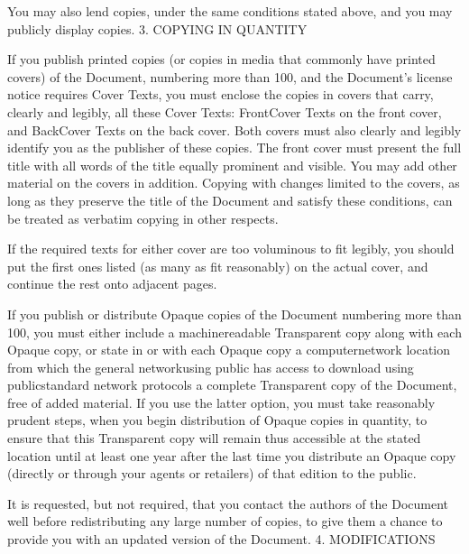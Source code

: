 \documentclass[letterpaper,10pt,english]{sphinxmanual}
\begin{document}
\sphinxAtStartPar
You may also lend copies, under the same conditions stated above, and you may publicly display copies.
3. COPYING IN QUANTITY

\sphinxAtStartPar
If you publish printed copies (or copies in media that commonly have printed covers) of the Document, numbering more than 100, and the Document’s license notice requires Cover Texts, you must enclose the copies in covers that carry, clearly and legibly, all these Cover Texts: Front\sphinxhyphen{}Cover Texts on the front cover, and Back\sphinxhyphen{}Cover Texts on the back cover. Both covers must also clearly and legibly identify you as the publisher of these copies. The front cover must present the full title with all words of the title equally prominent and visible. You may add other material on the covers in addition. Copying with changes limited to the covers, as long as they preserve the title of the Document and satisfy these conditions, can be treated as verbatim copying in other respects.

\sphinxAtStartPar
If the required texts for either cover are too voluminous to fit legibly, you should put the first ones listed (as many as fit reasonably) on the actual cover, and continue the rest onto adjacent pages.

\sphinxAtStartPar
If you publish or distribute Opaque copies of the Document numbering more than 100, you must either include a machine\sphinxhyphen{}readable Transparent copy along with each Opaque copy, or state in or with each Opaque copy a computer\sphinxhyphen{}network location from which the general network\sphinxhyphen{}using public has access to download using public\sphinxhyphen{}standard network protocols a complete Transparent copy of the Document, free of added material. If you use the latter option, you must take reasonably prudent steps, when you begin distribution of Opaque copies in quantity, to ensure that this Transparent copy will remain thus accessible at the stated location until at least one year after the last time you distribute an Opaque copy (directly or through your agents or retailers) of that edition to the public.

\sphinxAtStartPar
It is requested, but not required, that you contact the authors of the Document well before redistributing any large number of copies, to give them a chance to provide you with an updated version of the Document.
4. MODIFICATIONS
\end{document}
